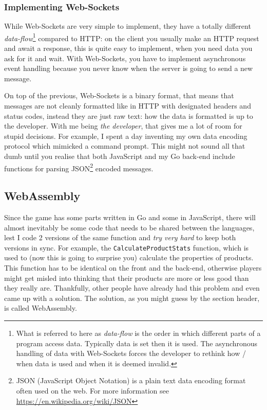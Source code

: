 \subsubsection{Implementing Web-Sockets}

While Web-Sockets are very simple to implement, they have a totally different \textit{data-flow}\footnote{What is referred
	to here as \textit{data-flow} is the order in which different parts of a program access data. Typically data is
	set then it is used. The asynchronous handling of data with Web-Sockets forces the developer to rethink how / when data
	is used and when it is deemed invalid.} compared to HTTP: on the client
you usually make an HTTP request and await a response, this is quite easy to implement, when you need data you ask for
it and wait. With Web-Sockets, you have to implement asynchronous event handling because you never know when the server
is going to send a new message.

On top of the previous, Web-Sockets is a binary format, that means that messages are not cleanly formatted like in HTTP
with designated headers and status codes, instead they are just raw text: how the data is formatted is up to the
developer. With me being \textit{the developer}, that gives me a lot of room for stupid decisions. For example, I spent a
day inventing my own data encoding protocol which mimicked a command prompt. This might not sound all that dumb until
you realise that both JavaScript and my Go back-end include functions for parsing JSON\footnote{JSON (JavaScript
	Object Notation) is a plain text data encoding format often used on the web. For more information see
	\href{https://en.wikipedia.org/wiki/JSON}{https://en.wikipedia.org/wiki/JSON}} encoded messages.

\subsection{WebAssembly}

Since the game has some parts written in Go and some in JavaScript, there will almost inevitably be some code that needs
to be shared between the languages, lest I code 2 versions of the same function and \textit{try very hard} to keep both versions in sync.
For example, the \verb|CalculateProductStats| function, which is used to (now this is going to surprise you) calculate the
properties of products. This function has to be identical on the front and the
back-end, otherwise players might get misled into thinking that their products are more or less good than they really
are. Thankfully, other people have already had this problem and even came up with a solution. The solution, as you might
guess by the section header, is called WebAssembly.

